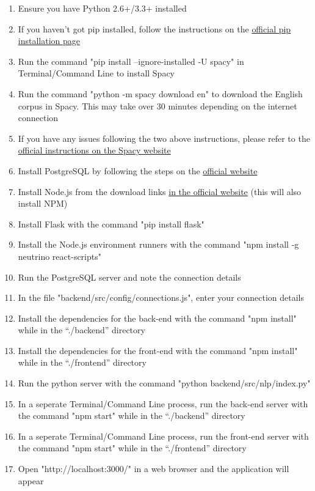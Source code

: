 \begin{enumerate}
\item  Ensure you have Python 2.6+/3.3+ installed
\item If you haven't got pip installed, follow the instructions on the \href{https://pip.pypa.io/en/stable/installing/}{official pip installation page}
\item Run the command "pip install --ignore-installed -U spacy" in Terminal/Command Line to install Spacy
\item Run the command  "python -m spacy download en" to download the English corpus in Spacy. This may take over 30 minutes depending on the internet connection
\item If you have any issues following the two above instructions, please refer to the  \href{https://spacy.io/docs/usage/}{official instructions on the Spacy website}
\item Install PostgreSQL by following the steps on the \href{https://www.postgresql.org/download/}{official website}
\item Install Node.js from the download links \href{https://nodejs.org/en}{in the official website} (this will also install NPM)
\item Install Flask with the command "pip install flask"
\item Install the Node.js environment runners with the command "npm install -g neutrino react-scripts"
\item Run the PostgreSQL server and note the connection details
\item In the file "backend/src/config/connections.js", enter your connection details
\item Install the dependencies for the back-end with the command "npm install" while in the ``./backend'' directory
\item Install the dependencies for the front-end with the command "npm install" while in the ``./frontend'' directory
\item Run the python server with the command "python backend/src/nlp/index.py"
\item In a seperate Terminal/Command Line process, run the back-end server with the command "npm start" while in the ``./backend'' directory
\item In a seperate Terminal/Command Line process, run the front-end server with the command "npm start" while in the ``./frontend'' directory
\item Open "http://localhost:3000/" in a web browser and the application will appear
\end{enumerate}

